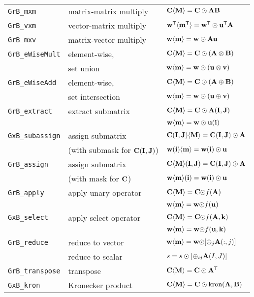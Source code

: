 \documentclass[12pt]{article}
\begin{document}
\vspace{0.05in}
{\footnotesize
\begin{tabular}{lll}
\hline
\verb'GrB_mxm'       & matrix-matrix multiply  & ${\bf C \langle M \rangle = C \odot AB}$ \\
\verb'GrB_vxm'       & vector-matrix multiply  & ${\bf w^{\sf T}\langle m^{\sf T}\rangle = w^{\sf T}\odot u^{\sf T}A}$ \\
\verb'GrB_mxv'       & matrix-vector multiply  & ${\bf w \langle m \rangle = w \odot Au}$ \\
\hline
\verb'GrB_eWiseMult' & element-wise,           & ${\bf C \langle M \rangle = C \odot (A \otimes B)}$ \\
                     & set union               & ${\bf w \langle m \rangle = w \odot (u \otimes v)}$ \\
\hline
\verb'GrB_eWiseAdd'  & element-wise,           & ${\bf C \langle M \rangle = C \odot (A \oplus  B)}$ \\
                     & set intersection        & ${\bf w \langle m \rangle = w \odot (u \oplus  v)}$ \\
\hline
\verb'GrB_extract'   & extract submatrix       & ${\bf C \langle M \rangle = C \odot A(I,J)}$ \\
                     &                         & ${\bf w \langle m \rangle = w \odot u(i)}$ \\
\hline
\verb'GxB_subassign' & assign submatrix        & ${\bf C (I,J) \langle M \rangle = C(I,J) \odot A}$ \\
                     & (with submask for ${\bf C(I,J)}$)
                                               & ${\bf w (i)   \langle m \rangle = w(i)   \odot u}$ \\
\hline
\verb'GrB_assign'    & assign submatrix        & ${\bf C \langle M \rangle (I,J) = C(I,J) \odot A}$ \\
                     & (with mask for ${\bf C}$)
                                               & ${\bf w \langle m \rangle (i)   = w(i)   \odot u}$ \\
\hline
\verb'GrB_apply'     & apply unary operator    & ${\bf C \langle M \rangle = C \odot} f{\bf (A)}$ \\
                     &                         & ${\bf w \langle m \rangle = w \odot} f{\bf (u)}$ \\
\hline
\verb'GxB_select'    & apply select operator   & ${\bf C \langle M \rangle = C \odot} f{\bf (A,k)}$ \\
                     &                         & ${\bf w \langle m \rangle = w \odot} f{\bf (u,k)}$ \\
\hline
\verb'GrB_reduce'    & reduce to vector        & ${\bf w \langle m \rangle = w \odot} [{\oplus}_j {\bf A}(:,j)]$ \\
                     & reduce to scalar        & $s = s \odot [{\oplus}_{ij}  {\bf A}(I,J)]$ \\
\hline
\verb'GrB_transpose' & transpose               & ${\bf C \langle M \rangle = C \odot A^{\sf T}}$ \\
\hline
\verb'GxB_kron'      & Kronecker product       & ${\bf C \langle M \rangle = C \odot \mbox{kron}(A, B)}$ \\
\hline
\end{tabular}
}
\end{document}
